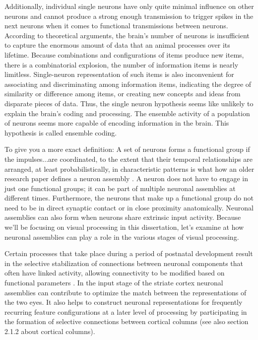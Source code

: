 \documentclass[12pt]{report}
\begin{document}
Additionally, individual single neurons have only quite minimal influence on other neurons and cannot produce a strong enough transmission to trigger spikes in the next neurons when it comes to functional transmissions between neurons. According to theoretical arguments, the brain's number of neurons is insufficient to capture the enormous amount of data that an animal processes over its lifetime. Because combinations and configurations of items produce new items, there is a combinatorial explosion, the number of information items is nearly limitless. Single-neuron representation of such items is also inconvenient for associating and discriminating among information items, indicating the degree of similarity or difference among items, or creating new concepts and ideas from disparate pieces of data. Thus, the single neuron hypothesis seems like unlikely to explain the brain's coding and processing. The ensemble activity of a population of neurons seems more capable of encoding information in the brain. This hypothesis is called ensemble coding.

To give you a more exact definition: A set of neurons forms a functional group if the impulses...are coordinated, to the extent that their temporal relationships are arranged, at least probabilistically, in characteristic patterns is what how an older research paper defines a neuron assembly \cite{gerstein1978} . A neuron does not have to engage in just one functional groups; it can be part of multiple neuronal assemblies at different times. Furthermore, the neurons that make up a functional group do not need to be in direct synaptic contact or in close proximity anatomically. Neuronal assemblies can also form when neurons share extrinsic input activity. Because we'll be focusing on visual processing in this dissertation, let's examine at how neuronal assemblies can play a role in the various stages of visual processing.

Certain processes that take place during a period of postnatal development result in the selective stabilization of connections between neuronal components that often have linked activity, allowing connectivity to be modified based on functional parameters \cite{singer1998}. In the input stage of the striate cortex neuronal assemblies can contribute to optimize the match between the representations of the two eyes. It also helps to construct neuronal representations for frequently recurring feature configurations at a later level of processing by participating in the formation of selective connections between cortical columns (see also section 2.1.2 about cortical columns).
\end{document}
